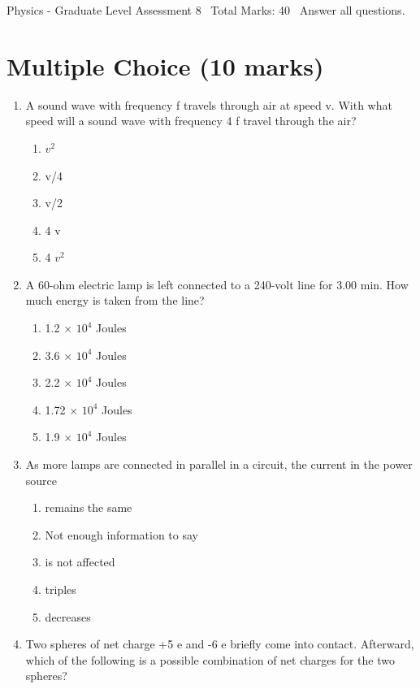 \documentclass[12pt]{article}
\begin{document}
\begin{center}
Physics - Graduate Level Assessment 8 \
Total Marks: 40 \
Answer all questions.
\end{center}

\section*{Multiple Choice (10 marks)}
\begin{enumerate}[label=\arabic*.]
\item A sound wave with frequency f travels through air at speed v. With what speed will a sound wave with frequency 4 f travel through the air?
\begin{enumerate}[label=(\alph*)]
    \item $v^2$
    \item v/4
    \item v/2
    \item 4 v
    \item 4 $v^2$
\end{enumerate}
\item A 60-ohm electric lamp is left connected to a 240-volt line for 3.00 min. How much energy is taken from the line?
\begin{enumerate}[label=(\alph*)]
    \item 1.2 \ensuremath{\times} $10^4$ Joules
    \item 3.6 \ensuremath{\times} $10^4$ Joules
    \item 2.2 \ensuremath{\times} $10^4$ Joules
    \item 1.72 \ensuremath{\times} $10^4$ Joules
    \item 1.9 \ensuremath{\times} $10^4$ Joules
\end{enumerate}
\item As more lamps are connected in parallel in a circuit, the current in the power source
\begin{enumerate}[label=(\alph*)]
    \item remains the same
    \item Not enough information to say
    \item is not affected
    \item triples
    \item decreases
\end{enumerate}
\item Two spheres of net charge +5 e and -6 e briefly come into contact. Afterward, which of the following is a possible combination of net charges for the two spheres?

\end{enumerate}
\end{document}
